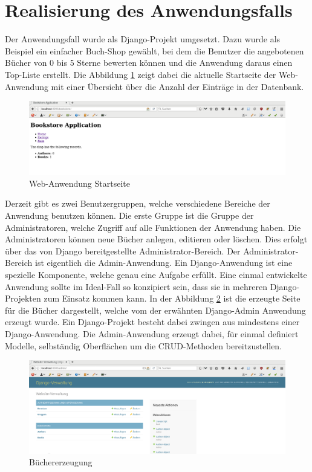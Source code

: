 \section{Realisierung des Anwendungsfalls}
Der Anwendungsfall wurde als Django-Projekt umgesetzt. Dazu wurde als Beispiel
ein einfacher Buch-Shop gewählt, bei dem die Benutzer die angebotenen Bücher von
0 bis 5 Sterne bewerten können und die Anwendung daraus einen Top-Liste erstellt.
Die Abbildung \ref{fig:django-start} zeigt dabei die aktuelle Startseite der
Web-Anwendung mit einer Übersicht über die Anzahl der Einträge in der Datenbank.

\begin{figure}
\centering
\includegraphics[scale=0.25]{images/Web-Application-Entry.png}
\caption{Web-Anwendung Startseite}
\label{fig:django-start}
\end{figure}

Derzeit gibt es zwei Benutzergruppen, welche verschiedene Bereiche der Anwendung
benutzen können. Die erste Gruppe ist die Gruppe der Administratoren, welche
Zugriff auf alle Funktionen der Anwendung haben. Die Administratoren können neue
Bücher anlegen, editieren oder löschen. Dies erfolgt über das von Django
bereitgestellte Administrator-Bereich. Der Administrator-Bereich ist eigentlich
die Admin-Anwendung. Ein Django-Anwendung ist eine spezielle Komponente, welche
genau eine Aufgabe erfüllt. Eine einmal entwickelte Anwendung sollte im
Ideal-Fall so konzipiert sein, dass sie in mehreren Django-Projekten zum Einsatz
kommen kann. In der Abbildung \ref{fig:django-create} ist die erzeugte Seite
für die Bücher dargestellt, welche vom der erwähnten Django-Admin Anwendung
erzeugt wurde.
Ein Django-Projekt besteht dabei zwingen aus mindestens einer
Django-Anwendung. Die Admin-Anwendung erzeugt dabei, für einmal definiert
Modelle, selbständig Oberflächen um die CRUD-Methoden bereitzustellen.

\begin{figure}
\centering
\includegraphics[scale=0.25]{images/Creation.png}
\caption{Büchererzeugung}
\label{fig:django-create}
\end{figure}

